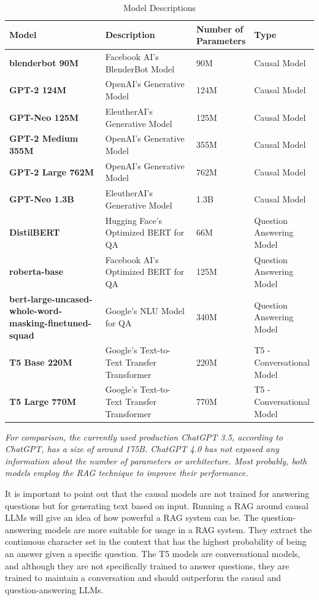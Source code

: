 \documentclass{wseas}
\begin{document}

\begin{table}[htbp]
\centering
\caption{Model Descriptions} %
\begin{tabular}{|p{0.3451\linewidth}|p{0.3239\linewidth}|p{0.1549\linewidth}|p{0.1761\linewidth}|}
\hline
\textbf{Model} & \textbf{Description} & \textbf{Number of Parameters} & \textbf{Type} \\
\hline
\textbf{blenderbot 90M} & Facebook AI's BlenderBot Model & 90M & Causal Model \\
\hline
\textbf{GPT-2 124M} & OpenAI's Generative Model & 124M & Causal Model \\
\hline
\textbf{GPT-Neo 125M} & EleutherAI's Generative Model & 125M & Causal Model \\
\hline
\textbf{GPT-2 Medium 355M} & OpenAI's Generative Model & 355M & Causal Model \\
\hline
\textbf{GPT-2 Large 762M} & OpenAI's Generative Model & 762M & Causal Model \\
\hline
\textbf{GPT-Neo 1.3B} & EleutherAI's Generative Model & 1.3B & Causal Model \\
\hline
\textbf{DistilBERT} & Hugging Face's Optimized BERT for QA & 66M & Question Answering Model \\
\hline
\textbf{roberta-base} & Facebook AI's Optimized BERT for QA & 125M & Question Answering Model \\
\hline
\textbf{bert-large-uncased-whole-word-masking-finetuned-squad} & Google's NLU Model for QA & 340M & Question Answering Model \\
\hline
\textbf{T5 Base 220M} & Google's Text-to-Text Transfer Transformer & 220M & T5 - Conversational Model \\
\hline
\textbf{T5 Large 770M} & Google's Text-to-Text Transfer Transformer & 770M & T5 - Conversational Model \\
\hline
\end{tabular}
\end{table}
  

\emph{For comparison, the currently used production ChatGPT 3.5,
according to ChatGPT, has a size of around 175B. ChatGPT 4.0 has not
exposed any information about the number of parameters or architecture.
Most probably, both models employ the RAG technique to improve their
performance.}

It is important to point out that the causal models are not trained for
answering questions but for generating text based on input. Running a
RAG around causal LLMs will give an idea of how powerful a RAG system
can be. The question-answering models are more suitable for usage in a
RAG system. They extract the continuous character set in the context
that has the highest probability of being an answer given a specific
question. The T5 models are conversational models, and although they are
not specifically trained to answer questions, they are trained to
maintain a conversation and should outperform the causal and
question-answering LLMs.
\end{document}
